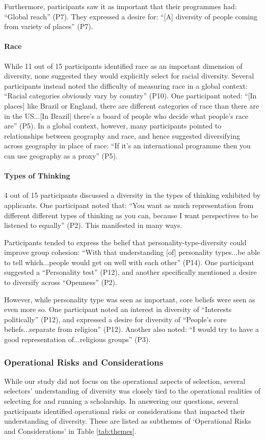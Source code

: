 Furthermore, participants saw it as important that their programmes had: ``Global reach'' (P7). They expressed a desire for: ``[A] diversity of people coming from variety of places'' (P7).

\paragraph{Race}
While 11 out of 15 participants identified race as an important dimension of diversity, none suggested they would explicitly select for racial diversity. Several participants instead noted the difficulty of measuring race in a global context: ``Racial categories obviously vary by country'' (P10). One participant noted: ``[In places] like Brazil or England, there are different categories of race than there are in the US...[In Brazil] there's a board of people who decide what people's race are'' (P5). In a global context, however, many participants pointed to relationships between geography and race, and hence suggested diversifying across geography in place of race: ``If it's an international programme then you can use geography as a proxy'' (P5).

\paragraph{Types of Thinking}
4 out of 15 participants discussed a diversity in the types of thinking exhibited by applicants. One participant noted that: ``You want as much representation from different different types of thinking as you can, because I want perspectives to be listened to equally'' (P2). This manifested in many ways.

Participants tended to express the belief that personality-type-diversity could improve group cohesion: ``With that understanding [of] personality types...be able to tell which...people would get on well with each other'' (P14). One participant suggested a ``Personality test'' (P12), and another specifically mentioned a desire to diversify across ``Openness'' (P2).

However, while personality type was seen as important, core beliefs were seen as even more so. One participant noted an interest in diversity of ``Interests politically'' (P12), and expressed a desire for diversity of ``People's core beliefs...separate from religion'' (P12). Another also noted: ``I would try to have a good representation of...religious groups'' (P3).

\subsubsection{Operational Risks and Considerations}
While our study did not focus on the operational aspects of selection, several selectors' understanding of diversity was closely tied to the operational realities of selecting for and running a scholarship. In answering our questions, several participants identified operational risks or considerations that impacted their understanding of diversity. These are listed as subthemes of `Operational Risks and Considerations' in Table \ref{tab:themes}.

